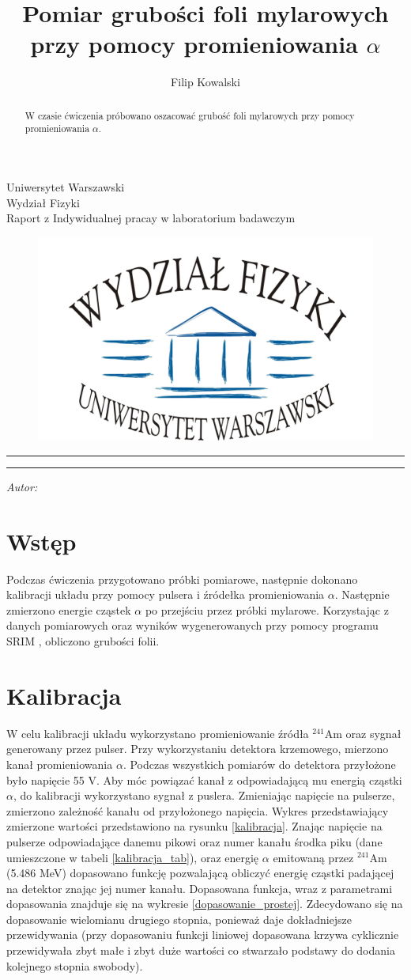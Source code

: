 \documentclass[12pt,a4paper]{article}
\author{Filip Kowalski }
\title{Pomiar grubości foli mylarowych przy pomocy promieniowania $\alpha$}
\makeatletter
\newcommand{\linia}{\rule{\linewidth}{0.4mm}}
\newcommand{\Ameryk}{${}^{241}_{}{}$Am }
\renewcommand{\maketitle}{\begin{titlepage}
    \vspace*{1cm}
    \begin{center}\small
    Uniwersytet Warszawski\\
    Wydział Fizyki\\
   Raport z Indywidualnej pracay w laboratorium badawczym
    \end{center}
    
\begin{figure}[h]
    \centering
    \includegraphics[scale=0.5]{logo.jpg}
    \end{figure}


    \vspace{3cm}
    \noindent\linia
    \begin{center}
      \LARGE \textsc{\@title}
         \end{center}
     \linia
    \vspace{0.5cm}
    \begin{flushright}
    \begin{minipage}{5cm}
    \textit{\small Autor:}\\
    \normalsize \textsc{\@author} \par
    \end{minipage}
    \vspace{5cm}
    
     \end{flushright}
    \vspace*{\stretch{6}}
    \begin{center}
    \@date
    \end{center}
         \end{titlepage}}
\makeatother
\begin{document}
\maketitle
\begin{abstract}
W czasie ćwiczenia próbowano oszacować grubość foli mylarowych przy pomocy promieniowania $\alpha$. 
\end{abstract}
\section{Wstęp}
Podczas ćwiczenia przygotowano próbki pomiarowe, następnie dokonano kalibracji układu przy pomocy pulsera i źródełka promieniowania $\alpha$. Następnie zmierzono energie cząstek $\alpha$ po przejściu przez próbki mylarowe. Korzystając z danych pomiarowych oraz wyników wygenerowanych przy pomocy programu SRIM \cite{srim}, obliczono grubości folii.

\section{Kalibracja}
W celu kalibracji układu wykorzystano promieniowanie źródła \Ameryk oraz sygnał generowany przez pulser. Przy wykorzystaniu detektora krzemowego, mierzono kanał promieniowania $\alpha$. Podczas wszystkich pomiarów do detektora przyłożone było napięcie 55 V. Aby móc powiązać kanał z odpowiadającą mu energią cząstki $\alpha$, do kalibracji wykorzystano sygnał z puslera. Zmieniając napięcie  na pulserze, zmierzono zależność kanału od przyłożonego napięcia. Wykres przedstawiający zmierzone wartości przedstawiono na rysunku \ref{kalibracja}. Znając napięcie na pulserze odpowiadające danemu pikowi oraz numer kanału środka piku (dane umieszczone w tabeli \ref{kalibracja_tab}), oraz energię $\alpha$ emitowaną przez \Ameryk  (5.486 MeV) dopasowano funkcję pozwalającą obliczyć energię cząstki padającej na detektor znając jej numer kanału. Dopasowana funkcja, wraz z parametrami dopasowania znajduje się na wykresie \ref{dopasowanie_prostej}. Zdecydowano się na dopasowanie wielomianu drugiego stopnia, ponieważ daje dokładniejsze przewidywania (przy dopasowaniu funkcji liniowej dopasowana krzywa cyklicznie przewidywała zbyt małe i zbyt duże wartości co stwarzało podstawy do dodania kolejnego stopnia swobody). 
\end{document}
